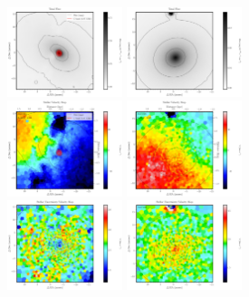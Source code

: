 \begin{figure}
      \centering
      \includegraphics[width=0.3\textwidth]{chapter4/Mmaps/ngc1316_stellar_img.png}
      \includegraphics[width=0.3\textwidth]{chapter4/Mmaps/ngc1399_stellar_img.png}
      \\
      \includegraphics[width=0.3\textwidth]{chapter4/Mmaps/ngc1316_stellar_vel.png}
      \includegraphics[width=0.3\textwidth]{chapter4/Mmaps/ngc1399_stellar_vel.png}
      \\
      \includegraphics[width=0.3\textwidth]{chapter4/Mmaps/ngc1316_stellar_vel_uncert.png}
      \includegraphics[width=0.3\textwidth]{chapter4/Mmaps/ngc1399_stellar_vel_uncert.png}

\end{figure}
